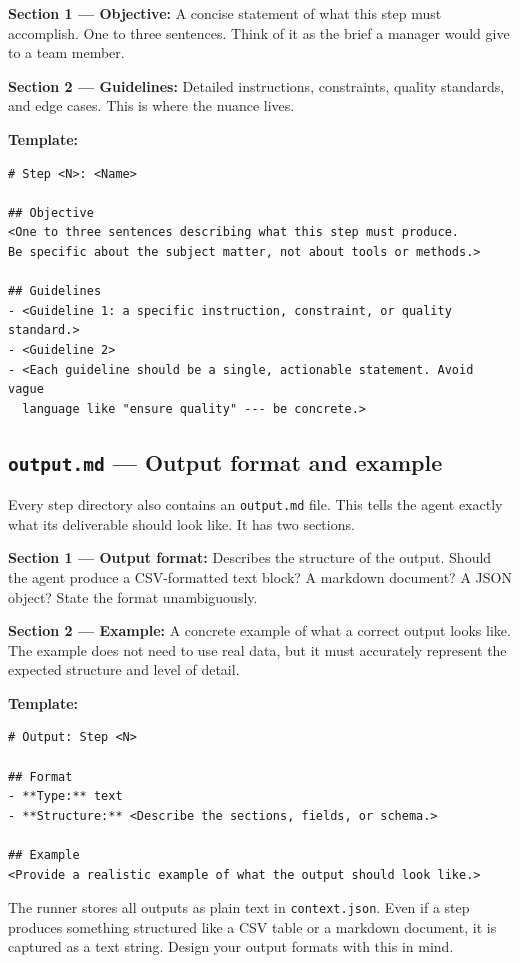 \documentclass[12pt, a4paper]{article}
\begin{document}
\textbf{Section 1 --- Objective:} A concise statement of what this step must accomplish. One to three sentences. Think of it as the brief a manager would give to a team member.

\textbf{Section 2 --- Guidelines:} Detailed instructions, constraints, quality standards, and edge cases. This is where the nuance lives.

\textbf{Template:}

\begin{lstlisting}[language={}]
# Step <N>: <Name>

## Objective
<One to three sentences describing what this step must produce.
Be specific about the subject matter, not about tools or methods.>

## Guidelines
- <Guideline 1: a specific instruction, constraint, or quality standard.>
- <Guideline 2>
- <Each guideline should be a single, actionable statement. Avoid vague
  language like "ensure quality" --- be concrete.>
\end{lstlisting}

\subsection{\texttt{output.md} --- Output format and example}

Every step directory also contains an \texttt{output.md} file. This tells the agent exactly what its deliverable should look like. It has two sections.

\textbf{Section 1 --- Output format:} Describes the structure of the output. Should the agent produce a CSV-formatted text block? A markdown document? A JSON object? State the format unambiguously.

\textbf{Section 2 --- Example:} A concrete example of what a correct output looks like. The example does not need to use real data, but it must accurately represent the expected structure and level of detail.

\textbf{Template:}

\begin{lstlisting}[language={}]
# Output: Step <N>

## Format
- **Type:** text
- **Structure:** <Describe the sections, fields, or schema.>

## Example
<Provide a realistic example of what the output should look like.>
\end{lstlisting}

\begin{notebox}
The runner stores all outputs as plain text in \texttt{context.json}. Even if a step produces something structured like a CSV table or a markdown document, it is captured as a text string. Design your output formats with this in mind.
\end{notebox}
\end{document}
